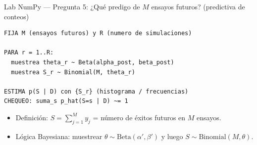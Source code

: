 \begin{frame}[fragile]{Lab NumPy — Pregunta 5: ¿Qué predigo de \(M\) ensayos futuros? (predictiva de conteos)}

\begin{verbatim}
FIJA M (ensayos futuros) y R (numero de simulaciones)

PARA r = 1..R:
  muestrea theta_r ~ Beta(alpha_post, beta_post)
  muestrea S_r ~ Binomial(M, theta_r)

ESTIMA p(S | D) con {S_r} (histograma / frecuencias)
CHEQUEO: suma_s p_hat(S=s | D) ~= 1
\end{verbatim}
\begin{itemize}
  \item Definición: \(S=\sum_{j=1}^M y_j\) = número de éxitos futuros en \(M\) ensayos.
  \item Lógica Bayesiana: muestrear \(\theta\sim\mathrm{Beta}(\alpha',\beta')\) y luego \(S\sim\mathrm{Binomial}(M,\theta)\).
\end{itemize}
\end{frame}

